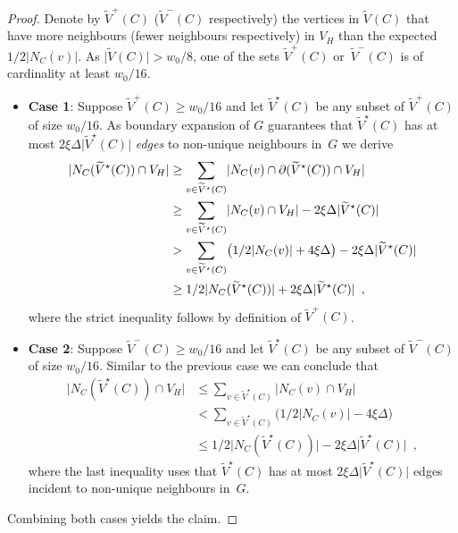 \documentclass{theoretics}
\providecommand{\abs}[1]{\lvert#1\rvert}
\providecommand{\Abs}[1]{\bigl\lvert#1\bigr\rvert}
\newcommand{\boundary}[1]{\ensuremath{\partial #1}}
\newcommand{\setsize}[1]{\lvert#1\rvert}
\newcommand{\eqcomma}{\enspace ,}
\newcommand{\neigh}[2][]{N_{{#1}}(#2)}
\newcommand{\uniqueneigh}[2][]{\boundary_{{#1}} ({#2})}
\newcommand{\diff}{\xi}
\newcommand{\GdegMax}{\Delta}
\newcommand{\V}[1][]{V_{#1}}
\newcommand{\Vh}{\V[H]}
\newcommand{\Vbad}[2][]{\widetilde V^{#1}(#2)}
\numberwithin{equation}{section}
\begin{document}
\begin{proof}
  Denote by $\Vbad[+]{C}$ ($\Vbad[-]{C}$ respectively) the vertices
  in $\Vbad{C}$ that have more neighbours (fewer neighbours respectively) in 
  $\Vh$ than the expected $1/2\Abs{ \neigh[C]{v} }$. As
  $\setsize{ \Vbad{C} } > w_0/8$, one of the sets 
  $\Vbad[+]{C}$ or~$\Vbad[-]{C}$
  is of cardinality at least $w_0/16$. 
  \begin{itemize}
  \item[] \textbf{Case 1}: Suppose 
    $\Vbad[+]{C} \geq w_0/16$ and let
    $\Vbad[\star]{C}$ be any subset of $\Vbad[+]{C}$ of 
    size $w_0/16$.
    As boundary expansion of $G$ guarantees 
    that $\Vbad[\star]{C}$ has at most 
    $2 \diff \GdegMax \setsize{ \Vbad[\star]{C} }$ \emph{edges} 
    to non-unique neighbours in~$G$ we derive
    \begin{align}
      \abs{ \neigh[C]{ \Vbad[\star]{C} } \cap \Vh } 
      &\ge \sum_{v \in\Vbad[\star]{C}} 
        \setsize{ \neigh[C]{v} \cap \uniqueneigh{\Vbad[\star]{C}} \cap \Vh }\\
      &\ge \sum_{v \in\Vbad[\star]{C}} \setsize{ \neigh[C]{v} \cap \Vh } - 
        2 \diff \GdegMax \setsize{\Vbad[\star]{C}}\\
      &> \sum_{v \in \Vbad[\star]{C}} 
        \bigl( 1/2\setsize{ \neigh[C]{v} } + 
        4 \diff \GdegMax  \bigr) -
        2 \diff \GdegMax \setsize{\Vbad[\star]{C}}\\
      &\ge 1/2 \abs{ \neigh[C]{ \Vbad[\star]{C} } } + 
        2 \diff \GdegMax \setsize{\Vbad[\star]{C}} \eqcomma
    \end{align}
    where the strict inequality follows by definition of $\Vbad[+]{C}$.
  \item[] \textbf{Case 2}: Suppose 
    $\Vbad[-]{C}  \geq w_0/16$ and let
    $\Vbad[\star]{C}$ be any subset of $\Vbad[-]{C}$ of 
    size $w_0/16$. Similar to the previous case we can conclude that
    \begin{align}
      \abs{ \neigh[C]{ \Vbad[\star]{C} } \cap \Vh } 
      &\le \sum_{v \in \Vbad[\star]{C}} \setsize{ \neigh[C]{v} \cap \Vh }\\
      &< \sum_{v \in \Vbad[\star]{C}} 
        \bigl( 1/2\setsize{ \neigh[C]{v} } -
        4 \diff \GdegMax  \bigr) \\
      &\leq 1/2 \abs{ \neigh[C]{ \Vbad[\star]{C} } } -
        2 \diff \GdegMax \setsize{\Vbad[\star]{C}} \eqcomma
    \end{align} 
    where the last inequality uses that  $\Vbad[\star]{C}$ has at most 
    $2 \diff \GdegMax \setsize{ \Vbad[\star]{C} }$ edges incident
    to non-unique neighbours in~$G$.
\end{itemize}
  Combining both cases yields the claim.
\end{proof}
\end{document}

